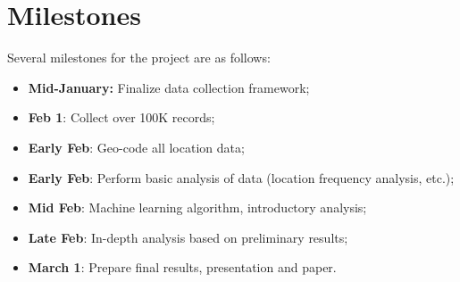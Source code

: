 \documentclass[conference]{IEEEtran}
\begin{document}
\section{Milestones}
Several milestones for the project are as follows:
\begin{itemize}
    \item \textbf{Mid-January:} Finalize data collection framework;
    \item \textbf{Feb 1}: Collect over 100K records;
    \item \textbf{Early Feb}: Geo-code all location data;
    \item \textbf{Early Feb}: Perform basic analysis of data (location frequency analysis, etc.);
    \item \textbf{Mid Feb}: Machine learning algorithm, introductory analysis;
    \item \textbf{Late Feb}: In-depth analysis based on preliminary results;
    \item \textbf{March 1}: Prepare final results, presentation and paper.
\end{itemize}



\end{document}
